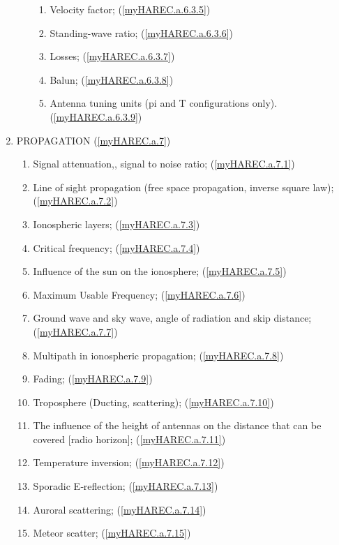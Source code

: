 \begin{enumerate}
\begin{enumerate}[noitemsep]
\begin{enumerate}[noitemsep]
\item Velocity factor; (\ref{myHAREC.a.6.3.5})\label{HAREC.a.6.3.5}
\item Standing-wave ratio; (\ref{myHAREC.a.6.3.6})\label{HAREC.a.6.3.6}
\item Losses; (\ref{myHAREC.a.6.3.7})\label{HAREC.a.6.3.7}
\item Balun; (\ref{myHAREC.a.6.3.8})\label{HAREC.a.6.3.8}
\item Antenna tuning units (pi and T configurations only). (\ref{myHAREC.a.6.3.9})\label{HAREC.a.6.3.9}
\end{enumerate}
\end{enumerate}
\item PROPAGATION (\ref{myHAREC.a.7})\label{HAREC.a.7}
\begin{enumerate}[noitemsep]
\item Signal attenuation,, signal to noise ratio; (\ref{myHAREC.a.7.1})\label{HAREC.a.7.1}
\item Line of sight propagation (free space propagation, inverse square law); (\ref{myHAREC.a.7.2})\label{HAREC.a.7.2}
\item Ionospheric layers; (\ref{myHAREC.a.7.3})\label{HAREC.a.7.3}
\item Critical frequency; (\ref{myHAREC.a.7.4})\label{HAREC.a.7.4}
\item Influence of the sun on the ionosphere; (\ref{myHAREC.a.7.5})\label{HAREC.a.7.5}
\item Maximum Usable Frequency; (\ref{myHAREC.a.7.6})\label{HAREC.a.7.6}
\item Ground wave and sky wave, angle of radiation and skip distance; (\ref{myHAREC.a.7.7})\label{HAREC.a.7.7}
\item Multipath in ionospheric propagation; (\ref{myHAREC.a.7.8})\label{HAREC.a.7.8}
\item Fading; (\ref{myHAREC.a.7.9})\label{HAREC.a.7.9}
\item Troposphere (Ducting, scattering); (\ref{myHAREC.a.7.10})\label{HAREC.a.7.10}
\item The influence of the height of antennas on the distance that can be covered [radio horizon]; (\ref{myHAREC.a.7.11})\label{HAREC.a.7.11}
\item Temperature inversion; (\ref{myHAREC.a.7.12})\label{HAREC.a.7.12}
\item Sporadic E‑reflection; (\ref{myHAREC.a.7.13})\label{HAREC.a.7.13}
\item Auroral scattering; (\ref{myHAREC.a.7.14})\label{HAREC.a.7.14}
\item Meteor scatter; (\ref{myHAREC.a.7.15})\label{HAREC.a.7.15}

\end{enumerate}
\end{enumerate}
